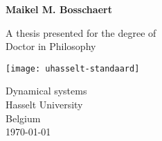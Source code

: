  \begin{titlepage}
     \begin{center}
         \vspace*{1cm}

         \huge
         \textbf{\thesistitle}

         \vspace{0.5cm}
         \large
         \thesissubtitle 
         

         \vspace{1.5cm}

         \textbf{Maikel M. Bosschaert}

         \vfill

         A thesis presented for the degree of \\
         Doctor in Philosophy 

         \vspace{0.8cm}
         \texttt{[image: uhasselt-standaard]}

         \vspace{0.8cm}
         Dynamical systems \\
         Hasselt University \\
         Belgium \\
         \today

     \end{center}
 \end{titlepage}
